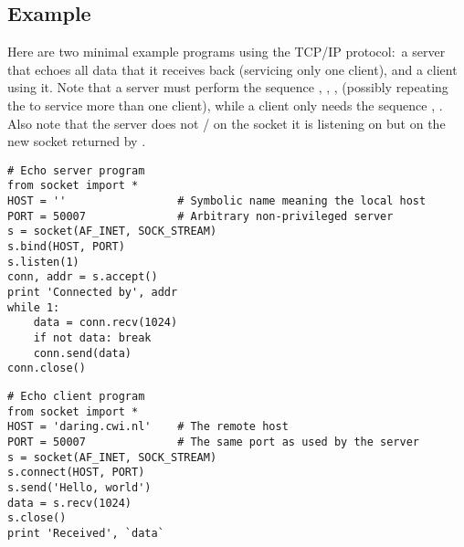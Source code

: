 \subsection{Example}

Here are two minimal example programs using the TCP/IP protocol:\ a
server that echoes all data that it receives back (servicing only one
client), and a client using it.  Note that a server must perform the
sequence , , , 
(possibly repeating the  to service more than one client),
while a client only needs the sequence , .
Also note that the server does not / on the
socket it is listening on but on the new socket returned by
.

\bcode\begin{verbatim}
# Echo server program
from socket import *
HOST = ''                 # Symbolic name meaning the local host
PORT = 50007              # Arbitrary non-privileged server
s = socket(AF_INET, SOCK_STREAM)
s.bind(HOST, PORT)
s.listen(1)
conn, addr = s.accept()
print 'Connected by', addr
while 1:
    data = conn.recv(1024)
    if not data: break
    conn.send(data)
conn.close()
\end{verbatim}\ecode
%
\bcode\begin{verbatim}
# Echo client program
from socket import *
HOST = 'daring.cwi.nl'    # The remote host
PORT = 50007              # The same port as used by the server
s = socket(AF_INET, SOCK_STREAM)
s.connect(HOST, PORT)
s.send('Hello, world')
data = s.recv(1024)
s.close()
print 'Received', `data`
\end{verbatim}\ecode
%
\begin{seealso}
\end{seealso}
